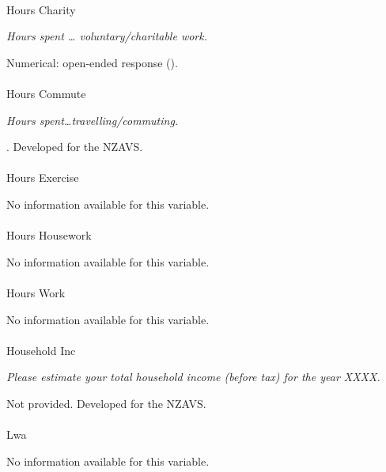\documentclass[
  single column]{article}
\makeatletter
\let\oldparagraph\paragraph
\renewcommand{\paragraph}{
    \@ifstar
      \xxxParagraphStar
      \xxxParagraphNoStar
  }
\newcommand{\xxxParagraphStar}[1]{\oldparagraph*{#1}\mbox{}}
\newcommand{\xxxParagraphNoStar}[1]{\oldparagraph{#1}\mbox{}}
\makeatother
\begin{document}
\paragraph{Hours Charity}\label{hours-charity}

\emph{Hours spent \ldots{} voluntary/charitable work.}

Numerical: open-ended response ().

\paragraph{Hours Commute}\label{hours-commute}

\emph{Hours spent\ldots travelling/commuting.}

. Developed for the NZAVS.

\paragraph{Hours Exercise}\label{hours-exercise}

No information available for this variable.

\paragraph{Hours Housework}\label{hours-housework}

No information available for this variable.

\paragraph{Hours Work}\label{hours-work}

No information available for this variable.

\paragraph{Household Inc}\label{household-inc}

\emph{Please estimate your total household income (before tax) for the
year XXXX.}

Not provided. Developed for the NZAVS.

\paragraph{Lwa}\label{lwa}

No information available for this variable.
\end{document}
